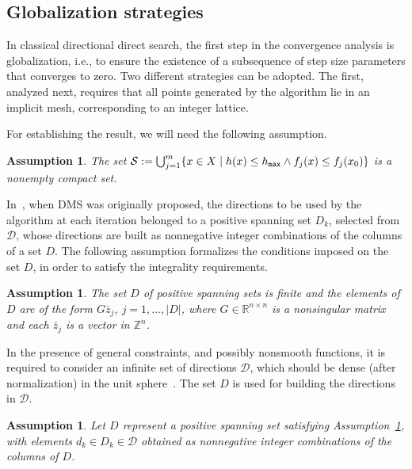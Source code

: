 \documentclass[12pt]{article}
\newtheorem{assumption}[theorem]{Assumption}
\newcommand{\set}[1]{\{#1\}}
\begin{document}
\subsection{Globalization strategies}

In classical directional direct search, the first step in the
convergence analysis is globalization, i.e., to ensure the
existence of a subsequence of step size parameters that converges
to zero. Two different strategies can be adopted. The first,
analyzed next, requires that all points generated by the algorithm
lie in an implicit mesh, corresponding to an integer lattice.

For establishing the result, we will need the following
assumption.

\begin{assumption}
\label{assumption1} The set $\mathcal{S}:=\bigcup_{j=1}^m\set{x\in
X \mid h(x)\leq h_{\tt max}\wedge f_j(x)\leq f_j(x_0)}$ is a
nonempty compact set.
\end{assumption}

In~\cite{custodio2011}, when DMS was originally proposed, the
directions to be used by the algorithm at each iteration belonged
to a positive spanning set $D_k$, selected from $\mathcal{D}$,
whose directions are built as nonnegative integer combinations of
the columns of a set $D$. The following assumption formalizes the
conditions imposed on the set $D$, in order to satisfy the
integrality requirements.

\begin{assumption}
\label{assumption2} The set $D$ of positive spanning sets is
finite and the elements of $D$ are of the form $G\bar{z}_j$,
$j=1,\ldots,|D|$,  where $G\in\mathbb{R}^{n\times n}$ is a
nonsingular matrix and each $\bar{z}_j$ is a vector in
$\mathbb{Z}^n$.
\end{assumption}

In the presence of general constraints, and possibly nonsmooth
functions, it is required to consider an infinite set of
directions $\mathcal{D}$, which should be dense (after
normalization) in the unit sphere~\cite{audet2006}. The set $D$ is
used for building the directions in $\mathcal{D}$.

\begin{assumption}
\label{assumption3} Let $D$ represent a positive spanning set
satisfying Assumption~\ref{assumption2}, with elements $d_k\in
D_k\in\mathcal{D}$ obtained as nonnegative integer combinations of
the columns of $D$.
\end{assumption}
\end{document}
